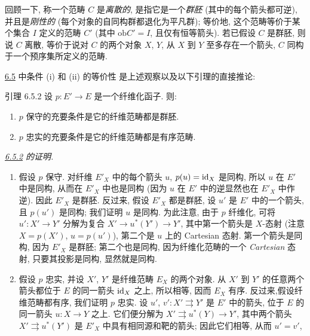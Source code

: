 \subsubsection{}
回顾一下, 称一个范畴 $C$ 是\emph{离散的}, 是指它是一个\emph{群胚}
(\ie 其中的每个箭头都可逆), 并且是\emph{刚性的}
(\ie 每个对象的自同构群都退化为平凡群);
等价地, 这个范畴等价于某个集合 $I$ 定义的范畴 $C'$
(其中 $\text{ob}C'=I$, 且仅有恒等箭头).
若已假设 $C$ 是群胚, 则说 $C$ 离散, 等价于说对 $C$ 的两个对象 $X$, $Y$,
从 $X$ 到 $Y$ 至多存在一个箭头, \ie $C$ 同构于一个预序集所定义的范畴.

\hyperref[I.prop6.5]{6.5} 中条件 (i) 和 (ii) 的等价性\pageoriginale
是上述观察以及以下引理的直接推论:

\begin{enonce*}{引理 6.5.2}
设 $p:E'\rightarrow E$ 是一个纤维化函子. 则:
\begin{enumerate}
\renewcommand{\theenumi}{\roman{enumi}}
\renewcommand{\labelenumi}{(\theenumi)}
\item $p$ 保守的充要条件是它的纤维范畴都是群胚.

\item $p$ 忠实的充要条件是它的纤维范畴都是有序范畴.
\end{enumerate}
\end{enonce*}

\noindent \emph{\hyperref[I.lem6.5.2]{6.5.2} 的证明.}
\begin{enumerate}
\renewcommand{\theenumi}{\roman{enumi}}
\renewcommand{\labelenumi}{(\theenumi)}
\item 假设 $p$ 保守. 对纤维 $E'_X$ 中的每个箭头 $u$,
$p(u)=\operatorname{id}_X$ 是同构, 所以 $u$ 在 $E'$ 中是同构,
从而在 $E'_X$ 中也是同构
(因为 $u$ 在 $E'$ 中的逆显然也在 $E'_X$ 中作逆).
因此 $E'_X$ 是群胚. 反过来, 假设 $E'_X$ 都是群胚,
设 $u'$ 是 $E'$ 中的一个箭头, 且 $p(u')$ 是同构; 我们证明 $u$ 是同构.
为此注意, 由于 $p$ 纤维化, 可将 $u':X'\rightarrow Y'$ 分解为复合
$X'\rightarrow u^\ast(Y')\rightarrow Y'$, 其中第一个箭头是 $X$-态射
(注意 $X=p(X')$, $u=p(u')$), 第二个是 $u$ 上的 Cartesian 态射.
第一个箭头是同构, 因为 $E'_X$ 是群胚;
第二个也是同构, 因为纤维化范畴的一个 \emph{Cartesian} 态射,
只要其投影是同构, 显然就是同构.

\item 假设 $p$ 忠实, 并设 $X'$, $Y'$ 是纤维范畴 $E_X$ 的两个对象.
从 $X'$ 到 $Y'$ 的任意两个箭头都位于 $E$ 的同一箭头 $\operatorname{id}_X$ 之上,
所以相等, 因而 $E_X$ 有序. 反过来,\pageoriginale 假设纤维范畴都有序,
我们证明 $p$ 忠实. 设 $u'$, $v':X'\rightrightarrows Y'$ 是 $E'$ 中的箭头,
位于 $E$ 的同一箭头 $u:X\rightarrow Y$ 之上.
它们便分解为 $X'\rightrightarrows u^\ast(Y)\rightarrow Y'$,
其中两个箭头 $X'\rightrightarrows u^\ast(Y')$ 是 $E'_X$ 中具有相同源和靶的箭头;
因此它们相等, 从而 $u'=v'$, \cqfd
\end{enumerate}

